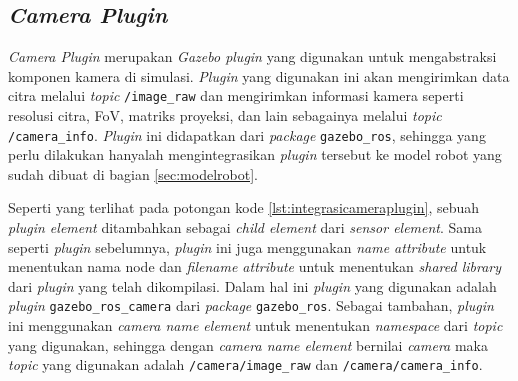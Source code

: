 \subsection{\emph{Camera Plugin}}
\label{subsec:cameraplugin}

\emph{Camera Plugin} merupakan \emph{Gazebo plugin} yang digunakan untuk mengabstraksi komponen kamera di simulasi.
\emph{Plugin} yang digunakan ini akan mengirimkan data citra melalui \emph{topic} \lstinline{/image_raw} dan mengirimkan informasi kamera seperti resolusi citra, FoV, matriks proyeksi, dan lain sebagainya melalui \emph{topic} \lstinline{/camera_info}.
\emph{Plugin} ini didapatkan dari \emph{package} \lstinline{gazebo_ros},
  sehingga yang perlu dilakukan hanyalah mengintegrasikan \emph{plugin} tersebut ke model robot yang sudah dibuat di bagian \ref{sec:modelrobot}.



Seperti yang terlihat pada potongan kode \ref{lst:integrasicameraplugin},
  sebuah \emph{plugin element} ditambahkan sebagai \emph{child element} dari \emph{sensor element}.
Sama seperti \emph{plugin} sebelumnya, \emph{plugin} ini juga menggunakan \emph{name attribute} untuk menentukan nama node dan \emph{filename attribute} untuk menentukan \emph{shared library} dari \emph{plugin} yang telah dikompilasi.
Dalam hal ini \emph{plugin} yang digunakan adalah \emph{plugin} \lstinline{gazebo_ros_camera} dari \emph{package} \lstinline{gazebo_ros}.
Sebagai tambahan, \emph{plugin} ini menggunakan \emph{camera name element} untuk menentukan \emph{namespace} dari \emph{topic} yang digunakan,
  sehingga dengan \emph{camera name element} bernilai \emph{camera} maka \emph{topic} yang digunakan adalah \lstinline{/camera/image_raw} dan \lstinline{/camera/camera_info}.
